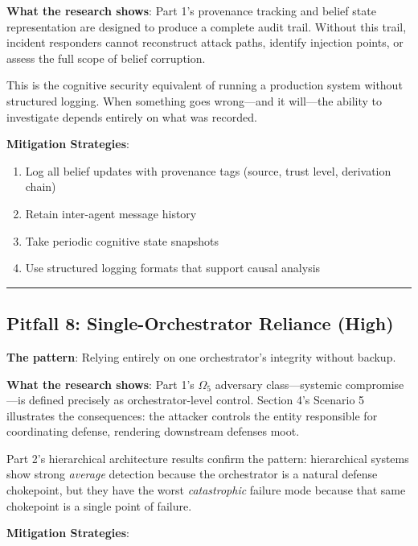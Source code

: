 \documentclass[
]{article}
\providecommand{\tightlist}{%
  \setlength{\itemsep}{0pt}\setlength{\parskip}{0pt}}
\begin{document}
\textbf{What the research shows}: Part 1's provenance tracking and
belief state representation are designed to produce a complete audit
trail. Without this trail, incident responders cannot reconstruct attack
paths, identify injection points, or assess the full scope of belief
corruption.

This is the cognitive security equivalent of running a production system
without structured logging. When something goes wrong---and it
will---the ability to investigate depends entirely on what was recorded.

\textbf{Mitigation Strategies}:

\begin{enumerate}
\def\labelenumi{\arabic{enumi}.}
\tightlist
\item
  Log all belief updates with provenance tags (source, trust level,
  derivation chain)
\item
  Retain inter-agent message history
\item
  Take periodic cognitive state snapshots
\item
  Use structured logging formats that support causal analysis
\end{enumerate}

\begin{center}\rule{0.5\linewidth}{0.5pt}\end{center}

\subsection{Pitfall 8: Single-Orchestrator Reliance
(High)}\label{pitfall-8-single-orchestrator-reliance-high}

\textbf{The pattern}: Relying entirely on one orchestrator's integrity
without backup.

\textbf{What the research shows}: Part 1's \(\Omega_5\) adversary
class---systemic compromise---is defined precisely as orchestrator-level
control. Section 4's Scenario 5 illustrates the consequences: the
attacker controls the entity responsible for coordinating defense,
rendering downstream defenses moot.

Part 2's hierarchical architecture results confirm the pattern:
hierarchical systems show strong \emph{average} detection because the
orchestrator is a natural defense chokepoint, but they have the worst
\emph{catastrophic} failure mode because that same chokepoint is a
single point of failure.

\textbf{Mitigation Strategies}:
\end{document}

